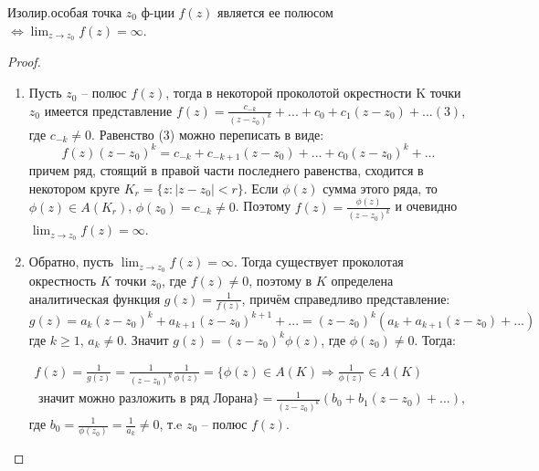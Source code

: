 \begin{theorem}
   Изолир.особая точка $z_0$ ф-ции $f(z)$ является ее полюсом $\Longleftrightarrow \displaystyle\lim_{z\rightarrow z_0}f(z)=\infty$.
\end{theorem}
\begin{proof}
\begin{enumerate}
    \item Пусть $z_0$ – полюс $f(z)$, тогда в некоторой проколотой окрестности K точки $z_0$ имеется представление $f(z)=\frac{c_{-k}}{(z-z_0)^k}+...+c_0+c_1(z-z_0)+...(3)$,
    где $c_{-k}\neq0$. Равенство (3) можно переписать в виде:
    $$f(z)(z-z_0)^k=c_{-k}+c_{-k+1}(z-z_0)+...+c_0(z-z_0)^k+...$$ причем ряд, стоящий в правой части последнего равенства, сходится в некотором круге $K_r=\{z:|z-z_0|<r\}$. Если $\phi(z)$ сумма этого ряда, то $\phi(z) \in A(K_r)$, $\phi(z_0)=c_{-k}\neq0$. Поэтому $f(z)=\frac{\phi(z)}{(z-z_0)^k}$ и очевидно $\displaystyle\lim_{z\rightarrow z_0}f(z)=\infty$.
    \item Обратно, пусть $\displaystyle\lim_{z\rightarrow z_0}f(z)=\infty$. Тогда существует
    проколотая окрестность $K$ точки $z_0$, где $f(z) \neq 0$, поэтому
    в $K$ определена аналитическая функция $g(z) = \frac{1}{f(z)}$, причём справедливо представление: $$g(z)=a_k(z-z_0)^k+a_{k+1}(z-z_0)^{k+1}+...=(z-z_0)^k(a_k+a_{k+1}(z-z_0)+...)$$ где $k\geq1$, $a_k\neq0$.
    Значит $g(z)=(z-z_0)^k\phi(z)$, где $\phi(z_0)\neq0$. Тогда:
    
    \begin{equation*}
    \begin{gathered}
        f(z)=\frac{1}{g(z)}=\frac{1}{(z-z_0)^k}\frac{1}{\phi(z)}=\{\phi(z) \in A(K) \Rightarrow \frac{1}{\phi(z)} \in A(K) \\
        \text { значит можно разложить в ряд Лорана}\}=
        \frac{1}{(z-z_0)^k}(b_0+b_1(z-z_0)+...),
    \end{gathered}
    \end{equation*}
    где $b_0=\frac{1}{\phi(z_0)}=\frac{1}{a_k}\neq0$, т.e $z_0$ -- полюс $f(z)$.

\end{enumerate}
\end{proof}


